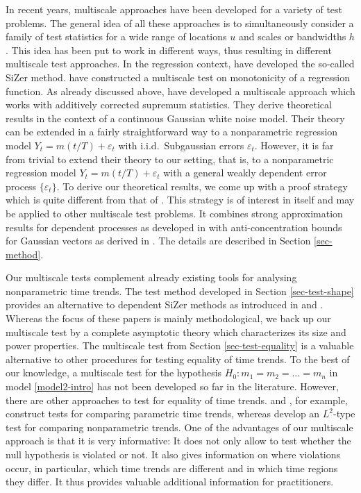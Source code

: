 In recent years, multiscale approaches have been developed for a variety of test problems. The general idea of all these approaches is to simultaneously consider a family of test statistics for a wide range of locations $u$ and scales or bandwidths $h$. This idea has been put to work in different ways, thus resulting in different multiscale test approaches. In the regression context, \cite{ChaudhuriMarron1999,ChaudhuriMarron2000} have developed the so-called SiZer method. 
\cite{HallHeckman2000} have constructed a multiscale test on monotonicity of a regression function. As already discussed above, \cite{DuembgenSpokoiny2001} have developed a multiscale approach which works with additively corrected supremum statistics. They derive theoretical results in the context of  a continuous Gaussian white noise model. Their theory can be extended in a fairly straightforward way to a nonparametric regression model $Y_t = m(t/T) + \varepsilon_t$ with i.i.d.\ Subgaussian errors $\varepsilon_t$. However, it is far from trivial to extend their theory to our setting, that is, to a nonparametric regression model $Y_t = m(t/T) + \varepsilon_t$ with a general weakly dependent error process $\{\varepsilon_t\}$. To derive our theoretical results, we come up with a proof strategy which is quite different from that of \cite{DuembgenSpokoiny2001}. This strategy is of interest in itself and may be applied to other multiscale test problems. It combines strong approximation results for dependent processes as developed in \cite{BerkesLiuWu2014} with anti-concentration bounds for Gaussian vectors as derived in \cite{Chernozhukov2015}. The details are described in Section \ref{sec-method}.


Our multiscale tests complement already existing tools for analysing nonparametric time trends. The test method developed in Section \ref{sec-test-shape} provides an alternative to dependent SiZer methods as introduced in \cite{Rondonotti2004} and \cite{Rondonotti2007}. Whereas the focus of these papers is mainly methodological, we back up our multiscale test by a complete asymptotic theory which characterizes its size and power properties. The multiscale test from Section \ref{sec-test-equality} is a valuable alternative to other procedures for testing equality of time trends. To the best of our knowledge, a multiscale test for the hypothesis $H_0: m_1 = m_2 = \ldots = m_n$ in model \eqref{model2-intro} has not been developed so far in the literature. However, there are other approaches to test for equality of time trends. \cite{Vogelsang2005} and \cite{Lyubchich2016}, for example, construct tests for comparing parametric time trends, whereas \cite{DegrasWu2012} develop an $L^2$-type test for comparing nonparametric trends. One of the advantages of our multiscale approach is that it is very informative: It does not only allow to test whether the null hypothesis is violated or not. It also gives information on where violations occur, in particular, which time trends are different and in which time regions they differ. It thus provides valuable additional information for practitioners. 


